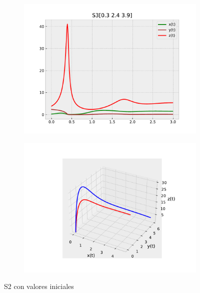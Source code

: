 \documentclass{wscpaperproc}
\theoremstyle{wsc}
\begin{document}
\begin{figure}[h]
	\centering
	\begin{subfigure}[b]{0.5\textwidth}
		\centering
		\includegraphics[width=\textwidth]{Simulations/S3[0.3 2.4 3.9].pdf}
	
		\label{fig:comparativa71}
	\end{subfigure}%
	\begin{subfigure}[b]{0.5\textwidth}
		\centering
		\includegraphics[width=\textwidth]{Simulations/S13d.pdf}
		\label{fig:comparativa72}
	\end{subfigure}
	\caption{S2 con valores iniciales}

	\label{fig:comparacion9}
\end{figure}
\end{document}
